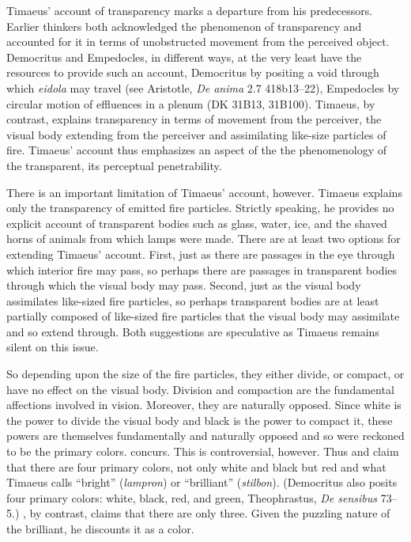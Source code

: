 Timaeus' account of transparency marks a departure from his predecessors. Earlier thinkers both acknowledged the phenomenon of transparency and accounted for it in terms of unobstructed movement from the perceived object. Democritus and Empedocles, in different ways, at the very least have the resources to provide such an account, Democritus by positing a void through which \emph{eidola} may travel (see Aristotle, \emph{De anima} 2.7 418b13–22), Empedocles by circular motion of effluences in a plenum (DK 31B13, 31B100). Timaeus, by contrast, explains transparency in terms of movement from the perceiver, the visual body extending from the perceiver and assimilating like-size particles of fire. Timaeus' account thus emphasizes an aspect of the the phenomenology of the transparent, its perceptual penetrability. 

There is an important limitation of Timaeus' account, however. Timaeus explains only the transparency of emitted fire particles. Strictly speaking, he provides no explicit account of transparent bodies such as glass, water, ice, and the shaved horns of animals from which lamps were made. There are at least two options for extending Timaeus' account. First, just as there are passages in the eye through which interior fire may pass, so perhaps there are passages in transparent bodies through which the visual body may pass. Second, just as the visual body assimilates like-sized fire particles, so perhaps transparent bodies are at least partially composed of like-sized fire particles that the visual body may assimilate and so extend through. Both suggestions are speculative as Timaeus remains silent on this issue.

So depending upon the size of the fire particles, they either divide, or compact, or have no effect on the visual body. Division and compaction are the fundamental affections involved in vision. Moreover, they are naturally opposed. Since white is the power to divide the visual body and black is the power to compact it, these powers are themselves fundamentally and naturally opposed and so were reckoned to be the primary colors. \citet[480--1]{Taylor:1928qb} concurs. This is controversial, however. Thus \citet{Brisson:1997qr} and \citet{Ierodiakonou:2005ly} claim that there are four primary colors, not only white and black but red and what Timaeus calls ``bright'' (\emph{lampron}) or ``brilliant'' (\emph{stilbon}). (Democritus also posits four primary colors: white, black, red, and green, Theophrastus, \emph{De sensibus} 73--5.) \citet[277]{Cornford:1935fk}, by contrast, claims that there are only three. Given the puzzling nature of the brilliant, he discounts it as a color.

